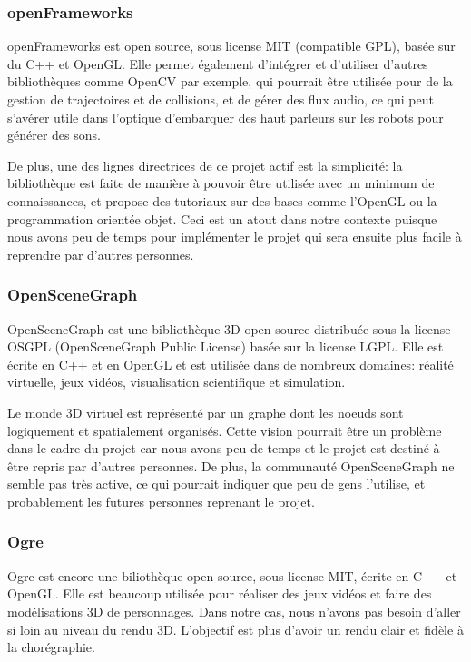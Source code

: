\subsubsection{openFrameworks}

openFrameworks est open source, sous license MIT (compatible GPL), basée sur du C++ et OpenGL. Elle permet également d'intégrer et d'utiliser d'autres bibliothèques comme OpenCV par exemple, qui pourrait être utilisée pour de la gestion de trajectoires et de collisions, et de gérer des flux audio, ce qui peut s'avérer utile dans l'optique d'embarquer des haut parleurs sur les robots pour générer des sons. 

De plus, une des lignes directrices de ce projet actif est la simplicité: la bibliothèque est faite de manière à pouvoir être utilisée avec un minimum de connaissances, et propose des tutoriaux sur des bases comme l'OpenGL ou la programmation orientée objet. Ceci est un atout dans notre contexte puisque nous avons peu de temps pour implémenter le projet qui sera ensuite plus facile à reprendre par d'autres personnes.

\subsubsection{OpenSceneGraph}

OpenSceneGraph est une bibliothèque 3D open source distribuée sous la license OSGPL (OpenSceneGraph Public License) basée sur la license LGPL. Elle est écrite en C++ et en OpenGL et est utilisée dans de nombreux domaines: réalité virtuelle, jeux vidéos, visualisation scientifique et simulation. 

Le monde 3D virtuel est représenté par un graphe dont les noeuds sont logiquement et spatialement organisés. Cette vision pourrait être un problème dans le cadre du projet car nous avons peu de temps et le projet est destiné à être repris par d'autres personnes. De plus, la communauté OpenSceneGraph ne semble pas très active, ce qui pourrait indiquer que peu de gens l'utilise, et probablement les futures personnes reprenant le projet. 

\subsubsection{Ogre}

Ogre est encore une biliothèque open source, sous license MIT, écrite en C++ et OpenGL. Elle est beaucoup utilisée pour réaliser des jeux vidéos et faire des modélisations 3D de personnages. Dans notre cas, nous n'avons pas besoin d'aller si loin au niveau du rendu 3D. L'objectif est plus d'avoir un rendu clair et fidèle à la chorégraphie.  


